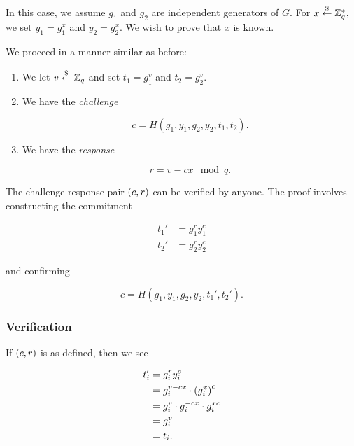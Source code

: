 In this case, we assume $g_{1}$ and $g_{2}$ are independent generators of $G$.
For $x\stackrel{\$}{\leftarrow}{}\mathbb{Z}_{q}^{*}$, we set $y_{1} = g_{1}^{x}$ and
$y_{2} = g_{2}^{x}$.
We wish to prove that $x$ is known.

We proceed in a manner similar as before:

\begin{enumerate}
\item We let $v\stackrel{\$}{\leftarrow}{}\mathbb{Z}_{q}$ and set $t_{1} = g_{1}^{v}$
    and $t_{2} = g_{2}^{v}$.
\item We have the \emph{challenge}

\begin{equation}
    c = H(g_{1},y_{1},g_{2},y_{2},t_{1},t_{2}).
\end{equation}

\item We have the \emph{response}

\begin{equation}
    r = v - cx \mod q.
\end{equation}
\end{enumerate}

The challenge-response pair $\left( c,r \right)$ can be verified by anyone.
The proof involves constructing the commitment

\begin{align}
    t_{1}' &= g_{1}^{r}y_{1}^{c} \nonumber\\
    t_{2}' &= g_{2}^{r}y_{2}^{c}
\end{align}

\noindent
and confirming

\begin{equation}
    c = H(g_{1},y_{1},g_{2},y_{2},t_{1}',t_{2}').
\end{equation}

\subsubsection{Verification}

If $\left( c,r \right)$ is as defined, then we see

\begin{align}
    t_{i}' &= g_{i}^{r}y_{i}^{c}
            \nonumber\\
        &= g_{i}^{v-cx}\cdot\left( g_{i}^{x} \right)^{c}
            \nonumber\\
        &= g_{i}^{v}\cdot g_{i}^{-cx}\cdot g_{i}^{xc}
            \nonumber\\
        &= g_{i}^{v}
            \nonumber\\
        &= t_{i}.
\end{align}

